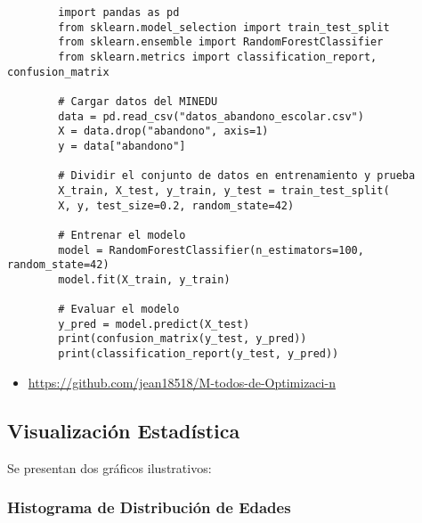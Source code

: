 \documentclass[12pt]{article}
\begin{document}
	\begin{verbatim}
		import pandas as pd
		from sklearn.model_selection import train_test_split
		from sklearn.ensemble import RandomForestClassifier
		from sklearn.metrics import classification_report, confusion_matrix
		
		# Cargar datos del MINEDU
		data = pd.read_csv("datos_abandono_escolar.csv")
		X = data.drop("abandono", axis=1)
		y = data["abandono"]
		
		# Dividir el conjunto de datos en entrenamiento y prueba
		X_train, X_test, y_train, y_test = train_test_split(
		X, y, test_size=0.2, random_state=42)
		
		# Entrenar el modelo
		model = RandomForestClassifier(n_estimators=100, random_state=42)
		model.fit(X_train, y_train)
		
		# Evaluar el modelo
		y_pred = model.predict(X_test)
		print(confusion_matrix(y_test, y_pred))
		print(classification_report(y_test, y_pred))
	\end{verbatim}
	\begin{itemize}
		\item \url{https://github.com/jean18518/M-todos-de-Optimizaci-n}
	\end{itemize}
	\lipsum[24]
	
	\subsection{Visualización Estadística}
	Se presentan dos gráficos ilustrativos:
	
	\subsubsection{Histograma de Distribución de Edades}
	\begin{center}
	\end{center}
	
\end{document}
